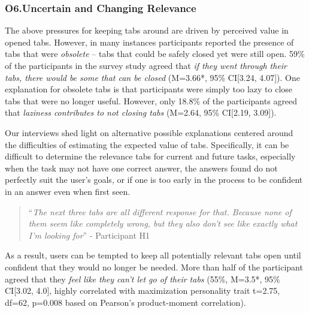 

\subsubsection{O6.Uncertain and Changing Relevance}

The above pressures for keeping tabs around are driven by perceived value in opened tabs. However, in many instances participants reported the presence of tabs that were \emph{obsolete} -- tabs that could be safely closed yet were still open.
59\% of the participants in the survey study agreed that \emph{if they went through their tabs, there would be some that can be closed} (M=3.66*, 95\% CI[3.24, 4.07]).
One explanation for obsolete tabs is that participants were simply too lazy to close tabs that were no longer useful. However, only 18.8\% of the participants agreed that \emph{laziness contributes to not closing tabs} (M=2.64, 95\% CI[2.19, 3.09]).

Our interviews shed light on alternative possible explanations centered around the difficulties of estimating the expected value of tabs.  Specifically, it can be difficult to determine the relevance tabs for current and future tasks, especially when the task may not have one correct answer, the answers found do not perfectly suit the user's goals, or if one is too early in the process to be confident in an answer even when first seen. 

\begin{quote}
``\emph{The next three tabs are all different response for that. Because none of them seem like completely wrong, but they also don't see like exactly what I'm looking for}'' - Participant H1
\end{quote}

As a result, users can be tempted to keep all potentially relevant tabs open until confident that they would no longer be needed. More than half of the participant agreed that they \emph{feel like they can't let go of their tabs} (55\%, M=3.5*, 95\% CI[3.02, 4.0], highly correlated with maximization personality trait t=2.75, df=62, p=0.008 based on Pearson's product-moment correlation). 



